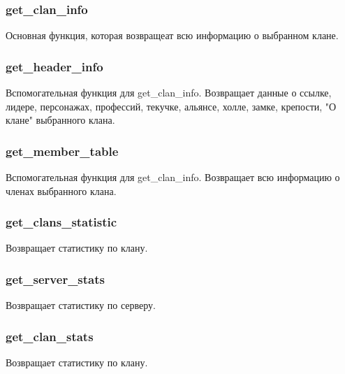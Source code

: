 \newpage

\subsubsection{get\_clan\_info}
Основная функция, которая возвращеат всю информацию о выбранном клане.

\parindent=1cm

\subsubsection{get\_header\_info}
Вспомогательная функция для get\_clan\_info. Возвращает данные о ссылке, лидере, персонажах, профессий, текучке, альянсе, холле, замке, крепости, "О клане" выбранного клана.

\parindent=1cm

\subsubsection{get\_member\_table}
Вспомогательная функция для get\_clan\_info. Возвращает всю информацию о членах выбранного клана.

\parindent=1cm

\subsubsection{get\_clans\_statistic}
Возвращает статистику по клану.

\parindent=1cm

\newpage

\subsubsection{get\_server\_stats}
Возвращает статистику по серверу.

\parindent=1cm

\subsubsection{get\_clan\_stats}
Возвращает статистику по клану.

\parindent=1cm

\newpage

